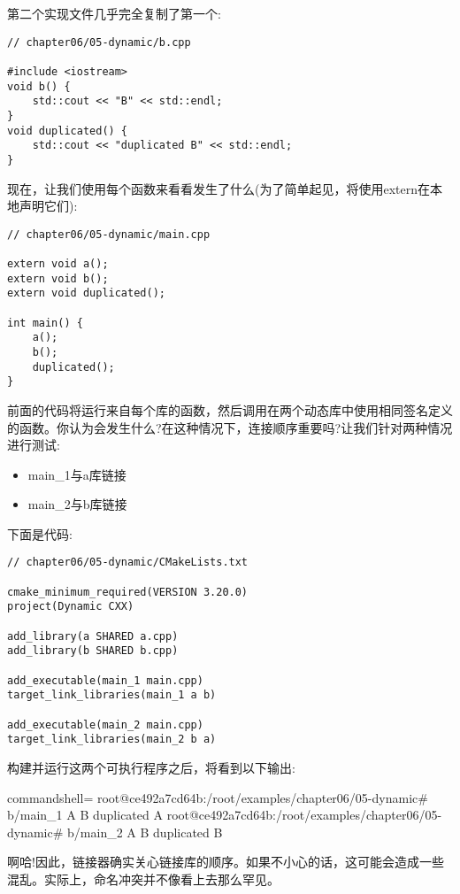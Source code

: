 第二个实现文件几乎完全复制了第一个:

\begin{lstlisting}[style=styleCXX]
// chapter06/05-dynamic/b.cpp

#include <iostream>
void b() {
	std::cout << "B" << std::endl;
}
void duplicated() {
	std::cout << "duplicated B" << std::endl;
}
\end{lstlisting}

现在，让我们使用每个函数来看看发生了什么(为了简单起见，将使用extern在本地声明它们):

\begin{lstlisting}[style=styleCXX]
// chapter06/05-dynamic/main.cpp

extern void a();
extern void b();
extern void duplicated();

int main() {
	a();
	b();
	duplicated();
}
\end{lstlisting}

前面的代码将运行来自每个库的函数，然后调用在两个动态库中使用相同签名定义的函数。你认为会发生什么?在这种情况下，连接顺序重要吗?让我们针对两种情况进行测试:

\begin{itemize}
\item 
main\_1与a库链接

\item 
main\_2与b库链接
\end{itemize}

下面是代码:

\begin{lstlisting}[style=styleCMake]
// chapter06/05-dynamic/CMakeLists.txt
	
cmake_minimum_required(VERSION 3.20.0)
project(Dynamic CXX)

add_library(a SHARED a.cpp)
add_library(b SHARED b.cpp)

add_executable(main_1 main.cpp)
target_link_libraries(main_1 a b)

add_executable(main_2 main.cpp)
target_link_libraries(main_2 b a)
\end{lstlisting}

构建并运行这两个可执行程序之后，将看到以下输出:

\begin{tcblisting}{commandshell={}}
root@ce492a7cd64b:/root/examples/chapter06/05-dynamic# b/main_1
A B
duplicated A
root@ce492a7cd64b:/root/examples/chapter06/05-dynamic# b/main_2
A
B
duplicated B
\end{tcblisting}

啊哈!因此，链接器确实关心链接库的顺序。如果不小心的话，这可能会造成一些混乱。实际上，命名冲突并不像看上去那么罕见。

